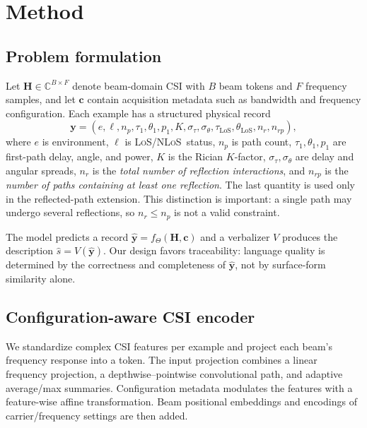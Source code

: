 \documentclass{article}
\newcommand{\los}{\textsc{LoS}}
\newcommand{\nlos}{\textsc{NLoS}}
\begin{document}
\section{Method}
\label{sec:method}

\subsection{Problem formulation}

Let $\mathbf{H}\in\mathbb{C}^{B\times F}$ denote beam-domain CSI with $B$ beam tokens and $F$ frequency samples, and let $\mathbf{c}$ contain acquisition metadata such as bandwidth and frequency configuration.
Each example has a structured physical record
\begin{equation}
  \mathbf{y} = (e,\ell,n_p,\tau_1,\theta_1,p_1,K,\sigma_\tau,\sigma_\theta,
  \tau_{\mathrm{LoS}},\theta_{\mathrm{LoS}},n_r,n_{rp}),
\end{equation}
where $e$ is environment, $\ell$ is \los/\nlos\ status, $n_p$ is path count, $\tau_1,\theta_1,p_1$ are first-path delay, angle, and power, $K$ is the Rician $K$-factor, $\sigma_\tau,\sigma_\theta$ are delay and angular spreads, $n_r$ is the \emph{total number of reflection interactions}, and $n_{rp}$ is the \emph{number of paths containing at least one reflection}.
The last quantity is used only in the reflected-path extension.
This distinction is important: a single path may undergo several reflections, so $n_r\le n_p$ is not a valid constraint.

The model predicts a record $\hat{\mathbf{y}}=f_\Theta(\mathbf{H},\mathbf{c})$ and a verbalizer $V$ produces the description $\hat{s}=V(\hat{\mathbf{y}})$.
Our design favors traceability: language quality is determined by the correctness and completeness of $\hat{\mathbf{y}}$, not by surface-form similarity alone.

\subsection{Configuration-aware CSI encoder}

We standardize complex CSI features per example and project each beam's frequency response into a token.
The input projection combines a linear frequency projection, a depthwise--pointwise convolutional path, and adaptive average/max summaries.
Configuration metadata modulates the features with a feature-wise affine transformation.
Beam positional embeddings and encodings of carrier/frequency settings are then added.
\end{document}
